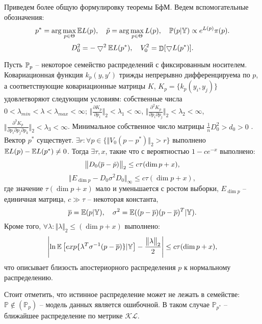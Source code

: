 \begin{remark}
Приведем более общую формулировку теоремы БфМ.  Ведем вспомогательные обозначения: 
\[
p^* = \arg \max \limits_{p \in \Theta} \mathrm{{\mathbb E}} L(p), \quad 
\Tilde{p} = \arg \max \limits_{p \in \Theta}  L(p) , \quad
\mathrm{{\mathbb P}}(p | \mathbb{Y}) \propto e^{L(p)} \pi(p).
\] 
\[
D_0^2 = - \bigtriangledown^2 \mathrm{{\mathbb E}} L(p^*), \quad
V_0^2 = \mathop{\mathbb{D}}\nolimits[\bigtriangledown L(p^*)].
\] 
\begin{theorem}
Пусть $\mathrm{{\mathbb P}}_p$ -- некоторое семейство распределений с фиксированным носителем. Ковариационная функция $k_p(y, y')$ трижды непрерывно дифференцируема по $p$, а соответствующие ковариационные матрицы $K$, $K_p = \{k_p(y_i, y_j)\}$ удовлетворяют следующим условиям:
 собственные числа $ 0 < \lambda_{min}< \lambda < \lambda_{max} < \infty$;
$\big \Vert \frac{\partial  K_p} {\partial p_i}  \big\Vert_2 < \lambda_1 < \infty $, 
 $\big\Vert \frac{\partial^2 K_p} { \partial p_i \partial p_j } \big\Vert_2 < \lambda_2 < \infty $, $\big\Vert \frac{ \partial^3 K_p }{ \partial p_i \partial p_j \partial p_k } \big\Vert_2 < \lambda_3 < \infty $.
Минимальное собственное число матрицы $\frac{1}{n} D_0^2 > d_0 >0$ . Вектор $p^*$ существует.  $\exists r: \forall p \in \{\Vert V_0(p - p^*) \Vert_2 > r \}$ выполнено $\mathrm{{\mathbb E}} L(p) - \mathrm{{\mathbb E}} L(p^*) \neq 0$. Тогда $\exists \tau, x$, такие что с вероятностью $1 - c e^{-x}$ выполнено: 
\[
\big\Vert D_0 (\overline{p} - \Tilde{p}) \big\Vert_2 \leq c \tau (\dim p + x),
\]
\[
\big\Vert E_{\dim p} - D_0 \sigma^2  D_0 \big\Vert_{\infty} \leq c \tau (\dim p + x),
\]
где  значение $\tau (\dim p + x)$ мало и уменьшается с ростом выборки,
$E_{\dim p}$ -- единичная матрица, $c \gg \tau$ -- некоторая константа,
\[
\overline{p} = \mathrm{{\mathbb E}}(p|\mathbb{Y}), \quad  \sigma^2 =  \mathrm{{\mathbb E}}((p - \overline{p}) (p - \overline{p})^T |\mathbb{Y}).
\] 
Кроме того, $\forall \lambda:  \big\Vert \lambda \big\Vert_2 \leq (\dim p + x)$ выполнено: 
\[
\left|
\ln \mathrm{{\mathbb E}} \left[
       exp\{\lambda^T \sigma^{-1}(p - \overline{p}) \} | \mathbb{Y} 
     \right] -  \frac{ \big\Vert \lambda \big\Vert_2}{2}
\right| \leq c \tau (\dim p + x),
\]
что описывает близость апостериорного распределения $p$ к нормальному распределению. 

Стоит отметить, что истинное распределение может не лежать в семействе:  $\mathbb{P} \not\in (\mathbb{P}_{p})$ -- модель данных является ошибочной. В таком случае 
$\mathbb{P}_{p^*}$ -- ближайшее распределение по метрике $\mathcal{KL}$.
\end{theorem}
\end{remark}


